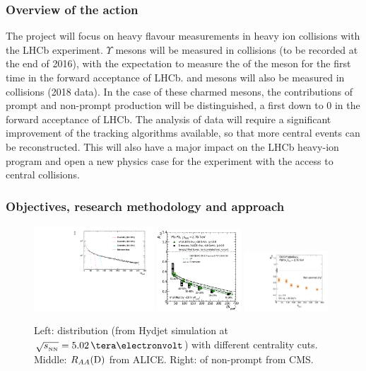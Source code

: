 \documentclass[a4paper,11pt]{article}
\begin{document}
\subsubsection{Overview of the action}

The project will focus on heavy flavour measurements in heavy ion collisions with the LHCb experiment. $\Upsilon$ mesons will be measured in \pPb collisions (to be recorded at the end of 2016), with the expectation to measure the \rpa of the \PgUc meson for the first time in the forward acceptance of LHCb.
\Dz and \Jpsi mesons will also be measured in \pbpb collisions (2018 data). In the case of these charmed mesons, the contributions of prompt and non-prompt production will be distinguished, a first
down to 0 \pt in the forward acceptance of LHCb. The analysis of \pbpb data will require a significant improvement of the tracking algorithms available, so that more
central events can be reconstructed. This will also have a major impact on the LHCb heavy-ion program and open a new physics case for the experiment with the access
to central \pbpb collisions.


\subsubsection{Objectives, research methodology and approach}

\begin{figure}[htb]
  \begin{center}
    \includegraphics[width=0.4\textwidth]{plots/centrality.pdf}
    \includegraphics[width=0.28\textwidth]{plots/ALICE_D0.pdf}
    \includegraphics[width=0.28\textwidth]{plots/NonPromptJpsi_RAAvsCent_slides.pdf}
  \end{center}
  \caption{Left: \npart distribution (from Hydjet simulation at $\sqrtsnn = 5.02\,\TeV$) with different centrality cuts. Middle: $R_{AA}(\text{D})$ from ALICE. Right: \raa of non-prompt \Jpsi from CMS.
  \label{fig:npart}}
\end{figure}
\end{document}
